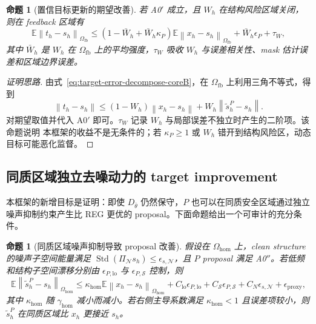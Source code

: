 \documentclass[11pt,a4paper,UTF8,fontset=fandol]{ctexart}
\newtheorem{proposition}[theorem]{命题}
\theoremstyle{definition}
\DeclareMathOperator{\Std}{Std}
\newcommand{\norm}[1]{\left\lVert#1\right\rVert}
\newcommand{\E}{\mathbb{E}}
\begin{document}
\begin{proposition}[置信目标更新的期望改善]
\label{prop:target-improvement-coreB}
若 A0$'$ 成立，且 $W_h$ 在结构风险区域关闭，则在 feedback 区域有
\begin{equation}
\label{eq:target-improvement-bound-coreB}
    \E\norm{t_h-s_h}_{\Omega_{\mathrm{fb}}}
    \le
    (1-\bar W_h+\bar W_h\kappa_P)\E\norm{x_h-s_h}_{\Omega_{\mathrm{fb}}}
    +\bar W_h\epsilon_P+\tau_W,
\end{equation}
其中 $\bar W_h$ 是 $W_h$ 在 $\Omega_{\mathrm{fb}}$ 上的平均强度，$\tau_W$ 吸收 $W_h$ 与误差相关性、mask 估计误差和区域边界误差。
\end{proposition}

\begin{proof}[证明思路]
由式~\eqref{eq:target-error-decompose-coreB}，在 $\Omega_{\mathrm{fb}}$ 上利用三角不等式，得到
\begin{equation}
    \norm{t_h-s_h}\le (1-W_h)\norm{x_h-s_h}+W_h\norm{\tilde s_h^P-s_h}.
\end{equation}
对期望取值并代入 A0$'$ 即可。$\tau_W$ 记录 $W_h$ 与局部误差不独立时产生的二阶项。该命题说明 本框架的收益不是无条件的；若 $\kappa_P\ge1$ 或 $W_h$ 错开到结构风险区，动态目标可能恶化监督。
\end{proof}



\subsection{同质区域独立去噪动力的 target improvement}

本框架的新增目标是证明：即使 $D_{\bar\theta}$ 仍然保守，$P$ 也可以在同质安全区域通过独立噪声抑制约束产生比 REG 更优的 proposal。下面命题给出一个可审计的充分条件。

\begin{proposition}[同质区域噪声抑制导致 proposal 改善]
\label{prop:hom-noise-improvement-coreC}
假设在 $\Omega_{\mathrm{hom}}$ 上，clean structure 的噪声子空间能量满足 $\Std(\Pi_{\mathcal N}s_h)\le\epsilon_{s,\mathcal N}$，且 $P$ proposal 满足 A0$''$。若低频和结构子空间漂移分别由 $\epsilon_{P,\mathrm{lo}}$ 与 $\epsilon_{P,\mathcal S}$ 控制，则
\begin{equation}
\label{eq:hom-improvement-bound-coreC}
    \E\norm{\tilde s_h^P-s_h}_{\Omega_{\mathrm{hom}}}
    \le
    \kappa_{\mathrm{hom}}\E\norm{x_h-s_h}_{\Omega_{\mathrm{hom}}}
    +C_{\mathrm{lo}}\epsilon_{P,\mathrm{lo}}
    +C_{\mathcal S}\epsilon_{P,\mathcal S}
    +C_N\epsilon_{s,\mathcal N}
    +\epsilon_{\mathrm{proxy}},
\end{equation}
其中 $\kappa_{\mathrm{hom}}$ 随 $\gamma_{\mathrm{hom}}$ 减小而减小。若右侧主导系数满足 $\kappa_{\mathrm{hom}}<1$ 且误差项较小，则 $\tilde s_h^P$ 在同质区域比 $x_h$ 更接近 $s_h$。
\end{proposition}
\end{document}
